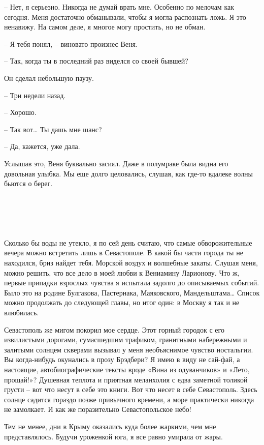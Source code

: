 \documentclass[
]{book}
\begin{document}
-- Нет, я серьезно. Никогда не думай врать мне. Особенно по мелочам как сегодня. Меня достаточно обманывали, чтобы я могла распознать ложь. Я это ненавижу. На самом деле, я многое могу простить, но не обман.

-- Я тебя понял, -- виновато произнес Веня.

-- Так, когда ты в последний раз виделся со своей бывшей?

Он сделал небольшую паузу.

-- Три недели назад.

-- Хорошо.

-- Так вот\ldots{} Ты дашь мне шанс?

-- Да, кажется, уже дала.

Услышав это, Веня буквально засиял. Даже в полумраке была видна его довольная улыбка. Мы еще долго целовались, слушая, как где-то вдалеке волны бьются о берег.

\hypertarget{chapter-11}{%
\chapter{~}\label{chapter-11}}

Сколько бы воды не утекло, я по сей день считаю, что самые обворожительные вечера можно встретить лишь в Севастополе. В какой бы части города ты не находился, бриз найдет тебя. Морской воздух и волшебные закаты. Слушая меня, можно решить, что все дело в моей любви к Вениамину Ларионову. Что ж, первые припадки взрослых чувства я испытала задолго до описываемых событий. Было это на родине Булгакова, Пастернака, Маяковского, Мандельштама\ldots{} Список можно продолжать до следующей главы, но итог один: в Москву я так и не влюбилась.

Севастополь же мигом покорил мое сердце. Этот горный городок с его извилистыми дорогами, сумасшедшим трафиком, гранитными набережными и залитыми солнцем скверами вызывал у меня необъяснимое чувство ностальгии. Вы когда-нибудь окунались в прозу Брэдбери? Я имею в виду не сай-фай, а настоящие, автобиографические тексты вроде «Вина из одуванчиков» и «Лето, прощай!»? Душевная теплота и приятная меланхолия с едва заметной толикой грусти -- вот что несут в себе это книги. Вот что несет в себе Севастополь. Здесь солнце садится гораздо позже привычного времени, а море практически никогда не замолкает. И как же поразительно Севастопольское небо!

Тем не менее, дни в Крыму оказались куда более жаркими, чем мне представлялось. Будучи уроженкой юга, я все равно умирала от жары.
\end{document}
